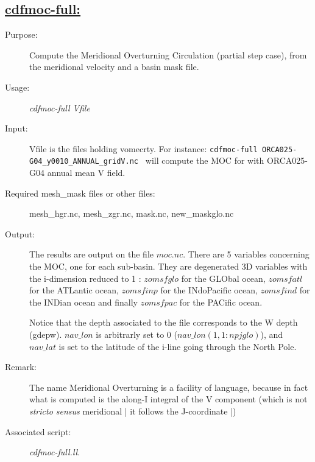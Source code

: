 \documentclass[a4paper,11pt]{article}
\begin{document}
\subsection*{\underline{cdfmoc-full:}}
\begin{description}
\item[Purpose:] Compute the Meridional Overturning Circulation (partial step case), from the meridional
velocity and a basin mask file.
\item[Usage:] {\em cdfmoc-full  Vfile }
\item[Input:] Vfile is the files holding vomecrty.
For instance: {\tt cdfmoc-full ORCA025-G04\_y0010\_ANNUAL\_gridV.nc }
will compute the MOC for with ORCA025-G04 annual mean V field.
\item[Required mesh\_mask files or other files:]   mesh\_hgr.nc, mesh\_zgr.nc, mask.nc, new\_maskglo.nc  \\
\item[Output:] The results are output on the file $moc.nc$. There are 5 variables concerning the MOC, one
for each sub-basin. They are degenerated 3D variables with the i-dimension
reduced to 1 : $zomsfglo$ for the GLObal ocean,
$zomsfatl$ for the ATLantic ocean, $zomsfinp$ for the INdoPacific ocean, $zomsfind$ for the INDian ocean and finally
$zomsfpac$ for the PACific ocean.

Notice that the depth associated to the file corresponds to the W depth (gdepw). $nav\_lon$ is arbitrarly
set to 0 ($nav\_lon(1,1:npjglo)$),
and $nav\_lat$ is set to the latitude of the i-line going through the North Pole.
\item[Remark:]  The name Meridional Overturning is a facility of language, because in fact what is computed is the along-I integral
of the V component (which is not {\em stricto sensus} meridional | it follows the J-coordinate |)
\item[Associated script:] {\em cdfmoc-full.ll}.
\end{description}


\newpage
\end{document}
